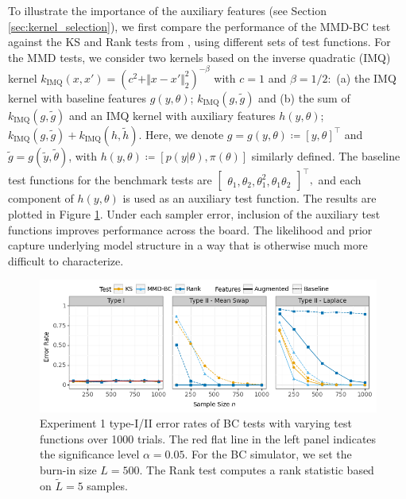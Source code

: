 \documentclass{article}
\begin{document}
To illustrate the importance of the auxiliary features (see Section \ref{sec:kernel_selection}), we first compare the performance of the MMD-BC test against the KS and Rank tests from \cite{gandy_unit_2020}, using different sets of test functions. 
For the MMD tests, we consider two kernels based on the inverse quadratic (IMQ) kernel $k_{\text{IMQ}}(x, x') = (c^{2} + \Vert x - x' \Vert_{2}^{2})^{-\beta}$ with $c=1$ and $\beta=1/2:$ 
(a) the IMQ kernel with baseline features $g(y, \theta)$; $k_{\mathrm{IMQ}}(g, \tilde{g})$ and 
(b) the sum of $k_{\mathrm{IMQ}}(g, \tilde{g})$ and an IMQ kernel with auxiliary features $h(y, \theta)$; $k_{\mathrm{IMQ}}(g, \tilde{g}) + k_{\mathrm{IMQ}}(h, \tilde{h})$. 
Here, we denote $g=g(y, \theta)\coloneqq[y, \theta]^{\top}$ and $\tilde{g}=g(\tilde{y}, \tilde{\theta})$, with $h(y, \theta)\coloneqq[p(y|\theta), \pi(\theta)]$ similarly defined. 
The baseline test functions for the benchmark tests are $\begin{bmatrix} \theta_{1}, \theta_{2}, \theta_{1}^{2}, \theta_{1}\theta_{2} \end{bmatrix}^\top,$ and each component of $h(y, \theta)$ is used as an auxiliary test function. 
The results are plotted in Figure \ref{fig:ex1_aux}. Under each sampler error, inclusion of the auxiliary test functions improves performance across the board. 
The likelihood and prior capture underlying model structure in a way that is otherwise much more difficult to characterize.

\begin{figure}
    \centering
    \includegraphics[width=\textwidth]{figures/results_1.png}
    \caption{
        Experiment 1 type-I/II error rates of BC tests with varying test functions over 1000 trials. 
        The red flat line in the left panel indicates the significance level $\alpha=0.05$. 
        For the BC simulator, we set the burn-in size $L=500$.
        The Rank test computes a rank statistic based on $\tilde{L}=5$ samples.
    }
    \label{fig:ex1_aux}
\end{figure}
\end{document}
